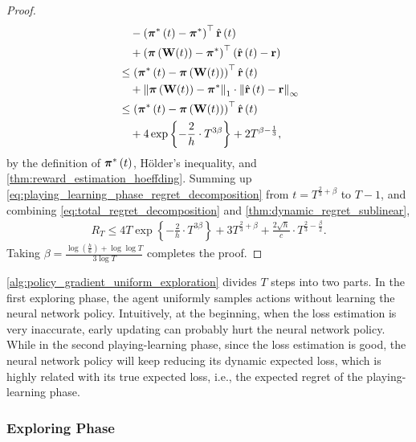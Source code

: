 \begin{proof}
\begin{equation}
\begin{split}
    &\quad - \left( {{\boldsymbol{\pi}}^*\left(t\right)} - {{\boldsymbol{\pi}}^*} \right)^\top \hat{{\mathbf{r}}}\left(t\right) \\
    &\quad + \left( {\boldsymbol{\pi}}\left( {\mathbf{W}}(t) \right) - {{\boldsymbol{\pi}}^*}\right)^\top \left( \hat{{\mathbf{r}}}\left(t\right) - {\mathbf{r}} \right) \\
    &\le \left( {{\boldsymbol{\pi}}^*\left(t\right)} - {\boldsymbol{\pi}}\left( {\mathbf{W}}(t) \right) \right)^\top \hat{{\mathbf{r}}}\left(t\right) \\
    &\quad + \left\| {\boldsymbol{\pi}}\left( {\mathbf{W}}(t) \right) - {\boldsymbol{\pi}}^* \right\|_1 \cdot \left\| \hat{{\mathbf{r}}}\left(t\right) - {\mathbf{r}} \right\|_\infty  \\
    &\le \left( {{\boldsymbol{\pi}}^*\left(t\right)} - {\boldsymbol{\pi}}\left( {\mathbf{W}}(t) \right) \right)^\top \hat{{\mathbf{r}}}\left(t\right) \\
    &\quad + 4 \exp\left\{ - \frac{2}{h} \cdot  T^{3\beta} \right\} + 2 T^{\beta - \frac{1}{3}},
\end{split}
\end{equation}
by the definition of ${\boldsymbol{\pi}}^*\left(t\right)$, H{\"o}lder's inequality, and \cref{thm:reward_estimation_hoeffding}. Summing up \cref{eq:playing_learning_phase_regret_decomposition} from $t = T^{\frac{2}{3} + \beta}$ to $T - 1$, and
combining \cref{eq:total_regret_decomposition} and \cref{thm:dynamic_regret_sublinear},
\begin{equation*}
\begin{split}
    R_T \le  4 T \exp\left\{ - \frac{2}{h} \cdot  T^{3\beta} \right\} + 3 T^{\frac{2}{3} + \beta} + \frac{2 \sqrt{h}}{ c} \cdot T^{\frac{2}{3} - \frac{\beta}{2}}.
\end{split}
\end{equation*}
Taking $\beta = \frac{ \log{\left(\frac{h}{6}\right) + \log{\log{T}} } }{ 3 \log{T}} $ completes the proof.
\end{proof}

\cref{alg:policy_gradient_uniform_exploration} divides $T$ steps into two parts. In the first exploring phase, the agent uniformly samples actions without learning the neural network policy. Intuitively, at the beginning, when the loss estimation is very inaccurate, early updating can probably hurt the neural network policy.  While in the second playing-learning phase, since the loss estimation is good, the neural network policy will keep reducing its dynamic expected loss, which is highly related with its true expected loss, i.e., the expected regret of the playing-learning phase.

\subsubsection{Exploring Phase}
\label{subsubsec:exploring_phase}

